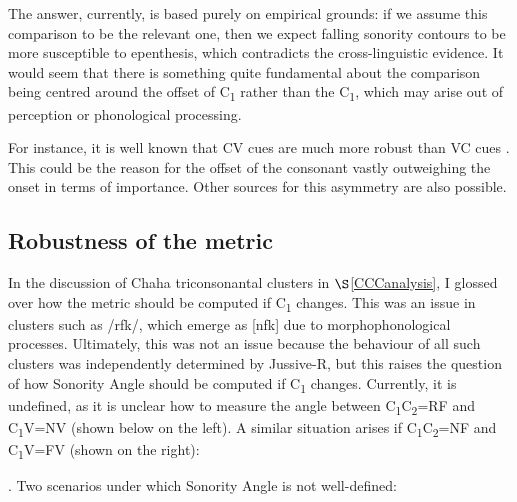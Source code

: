 \documentclass[12pt]{article}
\begin{document}
The answer, currently, is based purely on empirical grounds: if we assume this comparison to be the relevant one, then we expect falling sonority contours to be more susceptible to epenthesis, which contradicts the cross-linguistic evidence. It would seem that there is something quite fundamental about the comparison being centred around the offset of C\textsubscript{1} rather than the C\textsubscript{1}, which may arise out of perception or phonological processing.

For instance, it is well known that CV cues are much more robust than VC cues \citep{wright.2004}.
This could be the reason for the offset of the consonant vastly outweighing the onset in terms of importance. Other sources for this asymmetry are also possible.


\subsection{Robustness of the metric}

 In the discussion of Chaha triconsonantal clusters in  $\S$\ref{CCCanalysis}, I glossed over how the metric should be computed if C\textsubscript{1} changes.
This was an issue in clusters such as /rfk/, which emerge as [nfk] due to morphophonological processes. Ultimately, this was not an issue because the behaviour of all such clusters was independently determined by {\sc Jussive-R}, but this raises the question of how {\sc Sonority Angle} should be computed if C\textsubscript{1} changes. Currently, it is undefined, as it is unclear how to measure the angle between C\textsubscript{1}C\textsubscript{2}=RF and C\textsubscript{1}V=NV (shown below on the left). A similar situation arises if C\textsubscript{1}C\textsubscript{2}=NF and C\textsubscript{1}V=FV (shown on the right):

\ex. Two scenarios under which {\sc Sonority Angle} is not well-defined:

\begin{center}
\end{center}
\end{document}
